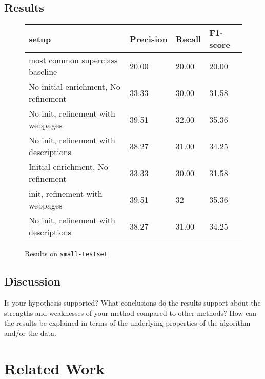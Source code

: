 \documentclass{article}
\begin{document}
\subsection{Results}


\begin{center}
\begin{figure}[hbtp]
\begin{tabular}{|l| l| l| l|}
\hline
{\bf setup} & {\bf Precision} & {\bf Recall} & {\bf F1-score}  \\
\hline \hline
most common superclass baseline & 20.00 & 20.00 & 20.00 \\
\hline
No initial enrichment, No refinement & 33.33 & 30.00 & 31.58 \\
\hline
No init, refinement with webpages & 39.51 & 32.00 & 35.36 \\
\hline
No init, refinement with descriptions & 38.27 & 31.00 & 34.25 \\
\hline
Initial enrichment, No refinement & 33.33 & 30.00 & 31.58 \\
\hline
init, refinement with webpages & 39.51 & 32 & 35.36 \\
\hline
No init, refinement with descriptions & 38.27 & 31.00 & 34.25 \\
\hline
\end{tabular}
\caption{Results on {\tt small-testset}}
\label{fig:res1}
\end{figure}
\end{center}


\subsection{Discussion}

Is your hypothesis supported? What conclusions do the results support about the strengths and weaknesses of your method compared to other methods? How can the results be explained in terms of the underlying properties of the algorithm and/or the data. 

\section{Related Work}

\end{document}
